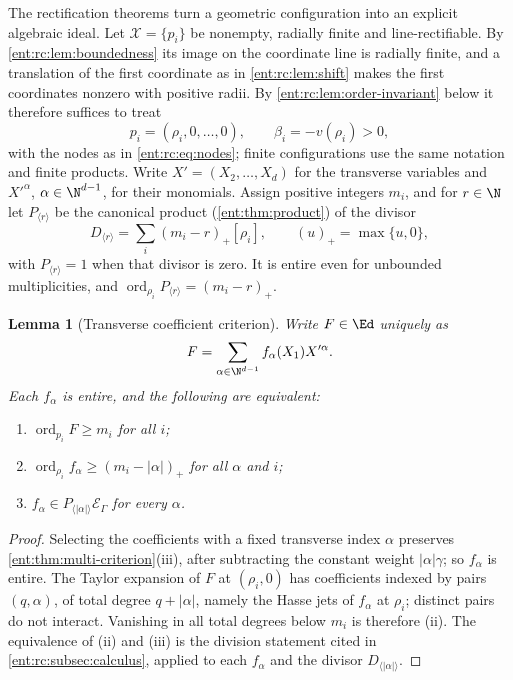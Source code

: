 \documentclass[11pt]{article}
\theoremstyle{plain}
\newtheorem{lemma}[lemma]{Lemma}
\theoremstyle{plain}
\theoremstyle{plain}
\theoremstyle{definition}
\theoremstyle{definition}
\theoremstyle{definition}
\theoremstyle{definition}
\theoremstyle{remark}
\newcommand{\E}{\mathcal E_\Gamma}
\DeclareMathOperator{\ord}{ord}\DeclareMathOperator{\cf}{cf}
\begin{document}
The rectification theorems turn a geometric configuration into an explicit
algebraic ideal. Let $\mathcal X=\{p_i\}$ be nonempty, radially finite and
line-rectifiable. By \cref{ent:rc:lem:boundedness} its image on the
coordinate line is radially finite, and a translation of the first coordinate
as in \cref{ent:rc:lem:shift} makes the first coordinates nonzero with
positive radii. By \cref{ent:rc:lem:order-invariant} below it therefore
suffices to treat
\begin{equation}\label{ent:rc:eq:line-D}
 p_i=(\rho_i,0,\ldots,0),\qquad\beta_i=-v(\rho_i)>0 ,
\end{equation}
with the nodes as in \eqref{ent:rc:eq:nodes}; finite configurations use the
same notation and finite products. Write $X'=(X_2,\ldots,X_d)$ for the
transverse variables and $X'^\alpha$, $\alpha\in\N^{d-1}$, for their
monomials. Assign positive integers $m_i$, and for $r\in\N$ let
$P_{\langle r\rangle}$ be the canonical product (\cref{ent:thm:product}) of
the divisor
\begin{equation}\label{ent:rc:eq:Pr}
 D_{\langle r\rangle}=\sum_i(m_i-r)_+[\rho_i],\qquad(u)_+=\max\{u,0\},
\end{equation}
with $P_{\langle r\rangle}=1$ when that divisor is zero. It is entire even
for unbounded multiplicities, and
$\ord_{\rho_i}P_{\langle r\rangle}=(m_i-r)_+$.

\begin{lemma}[Transverse coefficient criterion]\label{ent:rc:lem:transverse}
Write $F\in\Ed$ uniquely as
\[
 F=\sum_{\alpha\in\N^{d-1}}f_\alpha(X_1)X'^\alpha .
\]
Each $f_\alpha$ is entire, and the following are equivalent:
\begin{enumerate}[label=\textnormal{(\roman*)},leftmargin=2em]
\item $\ord_{p_i}F\ge m_i$ for all $i$;
\item $\ord_{\rho_i}f_\alpha\ge(m_i-|\alpha|)_+$ for all $\alpha$ and $i$;
\item $f_\alpha\in P_{\langle|\alpha|\rangle}\E$ for every $\alpha$.
\end{enumerate}
\end{lemma}
\begin{proof}
Selecting the coefficients with a fixed transverse index $\alpha$ preserves
\cref{ent:thm:multi-criterion}(iii), after subtracting the constant weight
$|\alpha|\gamma$; so $f_\alpha$ is entire. The Taylor expansion of $F$ at
$(\rho_i,0)$ has coefficients indexed by pairs $(q,\alpha)$, of total degree
$q+|\alpha|$, namely the Hasse jets of $f_\alpha$ at $\rho_i$; distinct pairs
do not interact. Vanishing in all total degrees below $m_i$ is therefore (ii).
The equivalence of (ii) and (iii) is the division statement cited in
\cref{ent:rc:subsec:calculus}, applied to each $f_\alpha$ and the divisor
$D_{\langle|\alpha|\rangle}$.
\end{proof}
\end{document}
